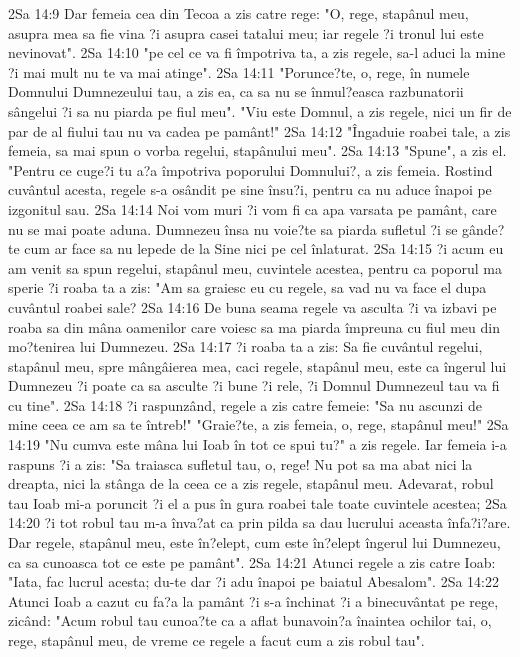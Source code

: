 2Sa 14:9  Dar femeia cea din Tecoa a zis catre rege: "O, rege, stapânul meu, asupra mea sa fie vina ?i asupra casei tatalui meu; iar regele ?i tronul lui este nevinovat".
2Sa 14:10  "pe cel ce va fi împotriva ta, a zis regele, sa-l aduci la mine ?i mai mult nu te va mai atinge".
2Sa 14:11  "Porunce?te, o, rege, în numele Domnului Dumnezeului tau, a zis ea, ca sa nu se înmul?easca razbunatorii sângelui ?i sa nu piarda pe fiul meu". "Viu este Domnul, a zis regele, nici un fir de par de al fiului tau nu va cadea pe pamânt!"
2Sa 14:12  "Îngaduie roabei tale, a zis femeia, sa mai spun o vorba regelui, stapânului meu".
2Sa 14:13  "Spune", a zis el. "Pentru ce cuge?i tu a?a împotriva poporului Domnului?, a zis femeia. Rostind cuvântul acesta, regele s-a osândit pe sine însu?i, pentru ca nu aduce înapoi pe izgonitul sau.
2Sa 14:14  Noi vom muri ?i vom fi ca apa varsata pe pamânt, care nu se mai poate aduna. Dumnezeu însa nu voie?te sa piarda sufletul ?i se gânde?te cum ar face sa nu lepede de la Sine nici pe cel înlaturat.
2Sa 14:15  ?i acum eu am venit sa spun regelui, stapânul meu, cuvintele acestea, pentru ca poporul ma sperie ?i roaba ta a zis: "Am sa graiesc eu cu regele, sa vad nu va face el dupa cuvântul roabei sale?
2Sa 14:16  De buna seama regele va asculta ?i va izbavi pe roaba sa din mâna oamenilor care voiesc sa ma piarda împreuna cu fiul meu din mo?tenirea lui Dumnezeu.
2Sa 14:17  ?i roaba ta a zis: Sa fie cuvântul regelui, stapânul meu, spre mângâierea mea, caci regele, stapânul meu, este ca îngerul lui Dumnezeu ?i poate ca sa asculte ?i bune ?i rele, ?i Domnul Dumnezeul tau va fi cu tine".
2Sa 14:18  ?i raspunzând, regele a zis catre femeie: "Sa nu ascunzi de mine ceea ce am sa te întreb!" "Graie?te, a zis femeia, o, rege, stapânul meu!"
2Sa 14:19  "Nu cumva este mâna lui Ioab în tot ce spui tu?" a zis regele. Iar femeia i-a raspuns ?i a zis: "Sa traiasca sufletul tau, o, rege! Nu pot sa ma abat nici la dreapta, nici la stânga de la ceea ce a zis regele, stapânul meu. Adevarat, robul tau Ioab mi-a poruncit ?i el a pus în gura roabei tale toate cuvintele acestea;
2Sa 14:20  ?i tot robul tau m-a înva?at ca prin pilda sa dau lucrului aceasta înfa?i?are. Dar regele, stapânul meu, este în?elept, cum este în?elept îngerul lui Dumnezeu, ca sa cunoasca tot ce este pe pamânt".
2Sa 14:21  Atunci regele a zis catre Ioab: "Iata, fac lucrul acesta; du-te dar ?i adu înapoi pe baiatul Abesalom".
2Sa 14:22  Atunci Ioab a cazut cu fa?a la pamânt ?i s-a închinat ?i a binecuvântat pe rege, zicând: "Acum robul tau cunoa?te ca a aflat bunavoin?a înaintea ochilor tai, o, rege, stapânul meu, de vreme ce regele a facut cum a zis robul tau".
